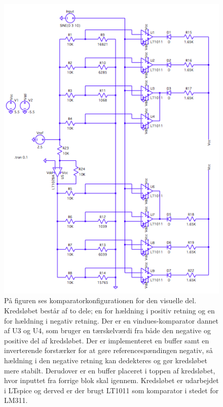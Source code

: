 \begin{figure}[H]
	\centering
	\includegraphics[scale=0.7]{figures/cProblemloesning/komparator_visuel1.PNG}
	\caption{På figuren ses komparatorkonfigurationen for den visuelle del. Kredsløbet består af to dele; en for hældning i positiv retning og en for hældning i negativ retning. Der er en vindues-komparator dannet af  U$3$ og U$4$, som bruger en tærskelværdi fra både den negative og positive del af kredsløbet. Der er implementeret en buffer samt en inverterende forstærker for at gøre referencespændingen negativ, så hældning i den negative retning kan dedekteres og gør kredsløbet mere stabilt. Derudover er en buffer placeret i toppen af kredsløbet, hvor inputtet fra forrige blok skal igennem.  Kredsløbet er udarbejdet i LTspice og derved er der brugt LT1011 som komparator i stedet for LM311.}
	\label{fig:komparator_visuel}
\end{figure}


